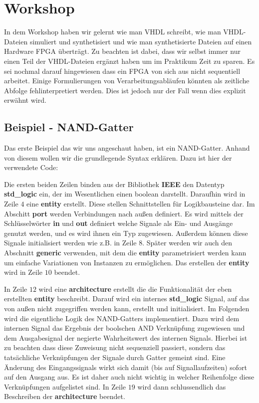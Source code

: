 \section{Workshop}
In dem Workshop haben wir gelernt wie man VHDL schreibt, wie man VHDL-Dateien simuliert und synthetisiert und wie man synthetisierte Dateien auf einen Hardware FPGA überträgt.
Zu beachten ist dabei, dass wir selbst immer nur einen Teil der VHDL-Dateien ergänzt haben um im Praktikum Zeit zu sparen.
Es sei nochmal darauf hingewiesen dass ein FPGA von sich aus nicht sequentiell arbeitet.
Einige Formulierungen von Verarbeitungsabläufen könnten als zeitliche Abfolge fehlinterpretiert werden.
Dies ist jedoch nur der Fall wenn dies explizit erwähnt wird.

\subsection{Beispiel - NAND-Gatter}
Das erste Beispiel das wir uns angeschaut haben, ist ein NAND-Gatter.
Anhand von diesem wollen wir die grundlegende Syntax erklären.
Dazu ist hier der verwendete Code:



Die ersten beiden Zeilen binden aus der Bibliothek \textbf{IEEE} den Datentyp \textbf{std\_logic} ein, der im Wesentlichen einen boolean darstellt.
Daraufhin wird in Zeile $4$ eine \textbf{entity} erstellt.
Diese stellen Schnittstellen für Logikbausteine dar.
Im Abschitt \textbf{port} werden Verbindungen nach außen definiert.
Es wird mittels der Schlüsselwörter \textbf{in} und \textbf{out} definiert welche Signale als Ein- und Ausgänge genutzt werden, und es wird ihnen ein Typ zugewiesen.
Außerdem können diese Signale initialisiert werden wie z.B. in Zeile $8$.
Später werden wir auch den Abschnitt \textbf{generic} verwenden, mit dem die \textbf{entity} parametrisiert werden kann um einfache Variationen von Instanzen zu ermöglichen.
Das erstellen der \textbf{entity} wird in Zeile $10$ beendet.

In Zeile $12$ wird eine \textbf{architecture} erstellt die die Funktionalität der eben erstellten \textbf{entity} beschreibt.
Darauf wird ein internes \textbf{std\_logic} Signal, auf das von außen nicht zugegriffen werden kann, erstellt und initialisiert.
Im Folgenden wird die eigentliche Logik des NAND-Gatters implementiert.
Dazu wird dem internen Signal das Ergebnis der boolschen AND Verknüpfung zugewiesen und dem Ausgabesignal der negierte Wahrheitswert des internen Signals.
Hierbei ist zu beachten dass diese Zuweisung nicht sequenziell passiert, sondern das tatsächliche Verknüpfungen der Signale durch Gatter gemeint sind.
Eine Änderung des Eingangssignals wirkt sich damit (bis auf Signallaufzeiten) sofort auf den Ausgang aus.
Es ist daher auch nicht wichtig in welcher Reihenfolge diese Verknüpfungen aufgelistet sind.
In Zeile $19$ wird dann schlussendlich das Beschreiben der \textbf{architecture} beendet.

